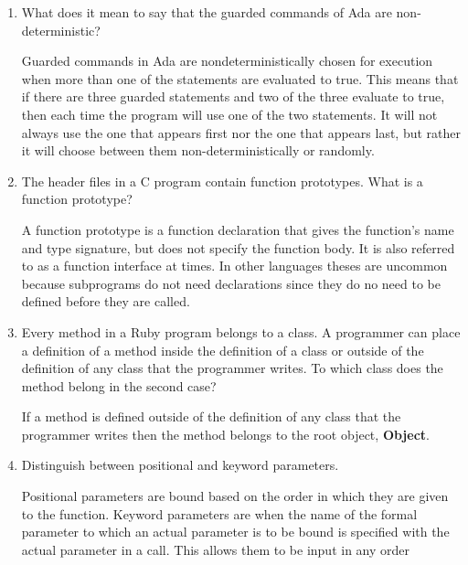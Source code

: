 \begin{enumerate}
  \item What does it mean to say that the guarded commands
    of Ada are non-deterministic?

 \begin{answer}
    Guarded commands in Ada are nondeterministically chosen for execution when more than one of the statements are evaluated to true. This means that if there are three guarded statements and two of the three evaluate to true, then each time the program will use one of the two statements. It will not always use the one that appears first nor the one that appears last, but rather it will choose between them non-deterministically or randomly.
     \end{answer}

  \item The header files in a C program contain function
    prototypes. What is a function prototype?

 \begin{answer}
   A function prototype is a function declaration that gives the function's name and type signature, but does not specify the function body. It is also referred to as a function interface at times. In other languages theses are uncommon because subprograms do not need declarations since they do no need to be defined before they are called.
 \end{answer}

  \item Every method in a Ruby program belongs to a class.
    A programmer can place a definition of a method inside
    the definition of a class or outside of the definition
    of any class that the programmer writes. To which class
    does the method belong in the second case?

 \begin{answer}
     If a method is defined outside of the definition of any class that the programmer writes then the method belongs to the root object, \textbf{Object}.
     \end{answer}

  \item Distinguish between positional and keyword parameters.

 \begin{answer}
    Positional parameters are bound based on the order in which they are given to the function. Keyword parameters are when the name of the formal parameter to which an actual parameter is to be bound is specified with the actual parameter in a call. This allows them to be input in any order
     \end{answer}


\end{enumerate}
